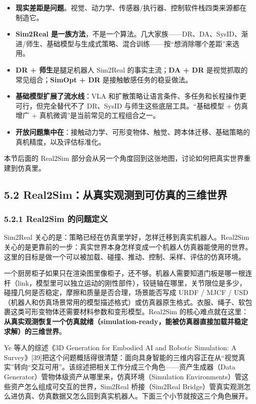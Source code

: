\documentclass[
  chinese,
]{ctexart}
\providecommand{\tightlist}{%
  \setlength{\itemsep}{0pt}\setlength{\parskip}{0pt}}
\begin{document}
\begin{itemize}
\tightlist
\item
  \textbf{现实差距是问题}。视觉、动力学、传感器/执行器、控制软件栈四类来源都在制造它。
\item
  \textbf{Sim2Real
  是一族方法}，不是一个算法。几大家族------DR、DA、SysID、渐进/师生、基础模型与生成式策略、混合训练------按``想消除哪个差距''来选用。
\item
  \textbf{DR + 师生}是腿足机器人 Sim2Real 的事实主流；\textbf{DA + DR}
  是视觉抓取的常见组合；\textbf{SimOpt + DR} 是接触敏感任务的稳妥做法。
\item
  \textbf{基础模型扩展了流水线}：VLA
  和扩散策略让语言条件、多任务和长程操作更可行，但完全替代不了 DR、SysID
  与师生这些底层工具。``基础模型 + 仿真增广 +
  真机微调''是当前常见的工程组合之一。
\item
  \textbf{开放问题集中在}：接触动力学、可形变物体、触觉、跨本体迁移、基础策略的真机精度，以及评估标准化。
\end{itemize}

本节后面的 Real2Sim
部分会从另一个角度回到这张地图，讨论如何把真实世界重建到仿真里。

\subsection{5.2
Real2Sim：从真实观测到可仿真的三维世界}\label{real2simux4eceux771fux5b9eux89c2ux6d4bux5230ux53efux4effux771fux7684ux4e09ux7ef4ux4e16ux754c}

\subsubsection{5.2.1 Real2Sim
的问题定义}\label{real2sim-ux7684ux95eeux9898ux5b9aux4e49}

Sim2Real 关心的是：策略已经在仿真里学好，怎样迁移到真实机器人。Real2Sim
关心的是更靠前的一步：真实世界本身怎样变成一个机器人仿真器能使用的世界。这里的目标是做一个可以被加载、碰撞、推动、控制、采样、评估的仿真环境。

一个厨房柜子如果只在渲染图里像柜子，还不够。机器人需要知道门板是哪一根连杆（link，模型里可以独立运动的刚性部件），铰链轴在哪里，关节限位是多少，碰撞几何是否稳定，摩擦和质量是否合理，场景能否写成
URDF / MJCF /
USD（机器人和仿真场景常用的模型描述格式）或仿真器原生格式。衣服、绳子、软包裹这类可形变物体还需要材料参数和变形模型。Real2Sim
的核心难点就在这里：\textbf{从真实观测恢复一个仿真就绪（simulation-ready，能被仿真器直接加载并稳定求解）的三维世界}。

Ye 等人的综述《3D Generation for Embodied AI and Robotic Simulation: A
Survey》{[}39{]}把这个问题概括得很清楚：面向具身智能的三维内容正在从``视觉真实''转向``交互可用''。该综述把相关工作分成三个角色------资产生成器（Data
Generator）管物体级资产从哪里来，仿真环境（Simulation
Environments）管这些资产怎么组成可交互的世界，Sim2Real 桥接（Sim2Real
Bridge）管真实观测怎么进仿真、仿真数据又怎么回到真实机器人。下面三个小节就按这三个角色展开。
\end{document}
